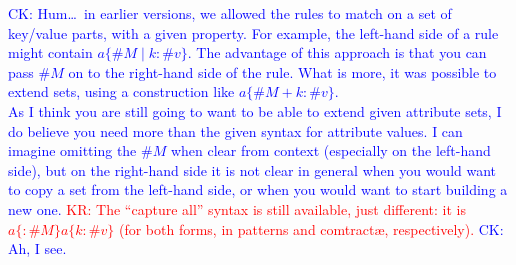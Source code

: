 \documentclass[letterpaper,11pt]{article}
\newcommand{\CK}[1]{\textcolor{blue}{CK: #1}}
\newcommand{\KR}[1]{\textcolor{red}{KR: #1}}
\begin{document}
\CK{Hum\dots\ in earlier versions, we allowed the rules to match on a
set of key/value parts, with a given property.  For example, the
left-hand side of a rule might contain $a\{ \#M \mid k:\#v \}$.  The
advantage of this approach is that you can pass $\#M$ on to the
right-hand side of the rule.  What is more, it was possible to extend
sets, using a construction like $a\{ \#M + k:\#v \}$. \\
As I think you are still going to want to be able to extend given
attribute sets, I do believe you need more than the given syntax for
attribute values.  I can imagine omitting the $\#M$ when clear from
context (especially on the left-hand side), but on the right-hand side
it is not clear in general when you would want to copy a set from the
left-hand side, or when you would want to start building a new one.}
\KR{The ``capture all'' syntax is still available, just different: it is
$a\{{:}\#M\} a\{k:\#v\}$ (for both forms, in patterns and comtractæ, respectively).}
\CK{Ah, I see.}
\end{document}
